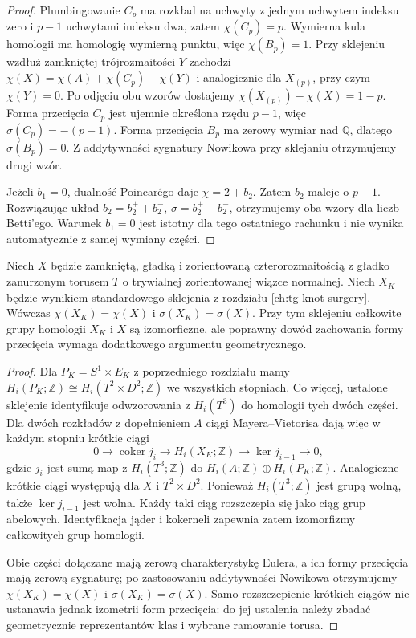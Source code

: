 \begin{proof}
Plumbingowanie $C_p$ ma rozkład na uchwyty z jednym uchwytem
indeksu zero i $p-1$ uchwytami indeksu dwa,
zatem $\chi(C_p)=p$. Wymierna kula homologii ma
homologię wymierną punktu, więc $\chi(B_p)=1$.
Przy sklejeniu wzdłuż zamkniętej trójrozmaitości $Y$
zachodzi $\chi(X)=\chi(A)+\chi(C_p)-\chi(Y)$ i analogicznie
dla $X_{(p)}$, przy czym $\chi(Y)=0$.
Po odjęciu obu wzorów dostajemy
$\chi(X_{(p)})-\chi(X)=1-p$.
Forma przecięcia $C_p$ jest ujemnie określona rzędu $p-1$,
więc $\sigma(C_p)=-(p-1)$. Forma przecięcia $B_p$
ma zerowy wymiar nad $\mathbb Q$, dlatego $\sigma(B_p)=0$.
Z addytywności sygnatury Nowikowa przy sklejaniu otrzymujemy
drugi wzór.

Jeżeli $b_1=0$, dualność Poincar\'ego daje
$\chi=2+b_2$. Zatem $b_2$ maleje o $p-1$.
Rozwiązując układ $b_2=b_2^++b_2^-$,
$\sigma=b_2^+-b_2^-$, otrzymujemy oba wzory dla liczb
Betti'ego. Warunek $b_1=0$ jest istotny dla tego ostatniego
rachunku i nie wynika automatycznie z samej wymiany części.
\end{proof}

\begin{stwierdzenie}
\label{prop:tg-syn-knot}
Niech $X$ będzie zamkniętą, gładką i zorientowaną
czterorozmaitością z gładko zanurzonym torusem $T$
o trywialnej zorientowanej wiązce normalnej.
Niech $X_K$ będzie wynikiem standardowego sklejenia
z rozdziału \ref{ch:tg-knot-surgery}. Wówczas
$\chi(X_K)=\chi(X)$ i $\sigma(X_K)=\sigma(X)$.
Przy tym sklejeniu całkowite grupy homologii $X_K$ i $X$
są izomorficzne, ale poprawny dowód zachowania formy
przecięcia wymaga dodatkowego argumentu geometrycznego.
\end{stwierdzenie}

\begin{proof}
Dla $P_K=S^1\times E_K$ z poprzedniego rozdziału mamy
$H_i(P_K;\mathbb Z)\cong H_i(T^2\times D^2;\mathbb Z)$
we wszystkich stopniach. Co więcej, ustalone sklejenie
identyfikuje odwzorowania z $H_i(T^3)$ do homologii tych dwóch
części. Dla dwóch rozkładów z dopełnieniem $A$ ciągi
Mayera--Vietorisa dają więc w każdym stopniu krótkie ciągi
\[
 0\longrightarrow\operatorname{coker} j_i
 \longrightarrow H_i(X_K;\mathbb Z)
 \longrightarrow\ker j_{i-1}\longrightarrow0,
\]
gdzie $j_i$ jest sumą map z $H_i(T^3;\mathbb Z)$ do
$H_i(A;\mathbb Z)\oplus H_i(P_K;\mathbb Z)$.
Analogiczne krótkie ciągi występują dla $X$ i $T^2\times D^2$.
Ponieważ $H_i(T^3;\mathbb Z)$ jest grupą wolną, także
$\ker j_{i-1}$ jest wolna. Każdy taki ciąg rozszczepia się
jako ciąg grup abelowych. Identyfikacja jąder i kokerneli
zapewnia zatem izomorfizmy całkowitych grup homologii.

Obie części dołączane mają zerową charakterystykę Eulera,
a ich formy przecięcia mają zerową sygnaturę; po
zastosowaniu addytywności Nowikowa otrzymujemy
$\chi(X_K)=\chi(X)$ i $\sigma(X_K)=\sigma(X)$.
Samo rozszczepienie krótkich ciągów nie ustanawia jednak
izometrii form przecięcia: do jej ustalenia należy zbadać
geometrycznie reprezentantów klas i wybrane ramowanie torusa.
\end{proof}

